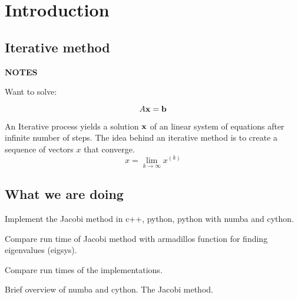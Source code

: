 \section{Introduction}

\subsection*{Iterative method}

\textbf{NOTES}

Want to solve:

\begin{equation}
    A\mathbf{x} = \mathbf{b}
\end{equation}

An Iterative process yields a solution $\mathbf{x}$ of an linear system of
equations after infinite number of steps. The idea behind an iterative method is
to create a sequence of vectors $x$ that converge.
\begin{equation}\label{eq:converge}
    x = \lim_{k \to \infty} x^{(k)}
\end{equation}

\subsection{What we are doing}

Implement the Jacobi method in c++, python, python with numba and cython.

Compare run time of Jacobi method with armadillos function for finding eigenvalues (eigsys).

Compare run times of the implementations.

Brief overview of numba and cython. The Jacobi method.
